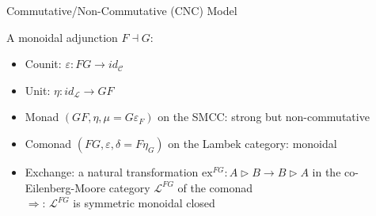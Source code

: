 \documentclass{beamer}
\begin{document}
\begin{frame}{Commutative/Non-Commutative (CNC) Model}

A monoidal adjunction $F\dashv G$:
\begin{itemize}
\item Counit: $\varepsilon:FG\rightarrow id_\mathcal{C}$
\item Unit: $\eta:id_\mathcal{L}\rightarrow GF$
\end{itemize}

\begin{center}
\end{center}

\begin{block}{}
\begin{itemize}
\item Monad $(GF,\eta,\mu=G\varepsilon_F)$ on the SMCC: strong but
      non-commutative
\item Comonad $(FG,\varepsilon,\delta=F\eta_G)$ on the Lambek category:
      monoidal
\item Exchange: a natural transformation
      $\mathrm{ex}^{FG}:A\triangleright B\rightarrow B\triangleright A$ in
      the co-Eilenberg-Moore category $\mathcal{L}^{FG}$ of the comonad \\
      $\Rightarrow$: $\mathcal{L}^{FG}$ is symmetric monoidal closed
\end{itemize}
\end{block}

\end{frame}
\end{document}

